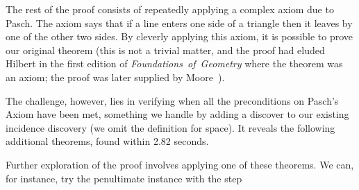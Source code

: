 The rest of the proof consists of repeatedly applying a complex axiom due to Pasch. The axiom says that if a line enters one side of a triangle then it leaves by one of the other two sides. By cleverly applying this axiom, it is possible to prove our original theorem (this is not a trivial matter, and the proof had eluded Hilbert in the first edition of \emph{Foundations~of~Geometry} where the theorem was an axiom; the proof was later supplied by Moore~\cite{MooreProof}). 

The challenge, however, lies in verifying when all the preconditions on Pasch's Axiom have been met, something we handle by adding a discover  to our existing incidence discovery (we omit the definition for space). It reveals the following additional theorems, found within 2.82 seconds.

\vspace{0.2cm}
\noindent{}
\vspace{0.1cm}

Further exploration of the proof involves applying one of these theorems. We can, for instance, try the penultimate instance with the step

\vspace{0.2cm}
\noindent{}
\vspace{0.1cm}


